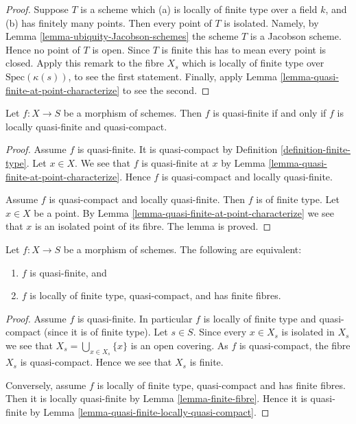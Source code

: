 \begin{proof}
Suppose $T$ is a scheme which (a) is locally of finite type
over a field $k$, and (b) has finitely many points. Then every
point of $T$ is isolated. Namely, by
Lemma \ref{lemma-ubiquity-Jacobson-schemes} the scheme $T$ is a
Jacobson scheme. Hence no point of $T$ is open. Since $T$ is
finite this has to mean every point is closed. Apply this remark
to the fibre $X_s$ which is locally of finite type over
$\text{Spec}(\kappa(s))$, to see the first statement. Finally, apply
Lemma \ref{lemma-quasi-finite-at-point-characterize} to see the second.
\end{proof}


\begin{lemma}
\label{lemma-quasi-finite-locally-quasi-compact}
Let $f : X \to S$ be a morphism of schemes.
Then $f$ is quasi-finite if and only if $f$ is
locally quasi-finite and quasi-compact.
\end{lemma}

\begin{proof}
Assume $f$ is quasi-finite. It is quasi-compact by Definition
\ref{definition-finite-type}. Let $x \in X$.
We see that $f$ is quasi-finite at $x$ by
Lemma \ref{lemma-quasi-finite-at-point-characterize}.
Hence $f$ is quasi-compact and locally quasi-finite.

\medskip\noindent
Assume $f$ is quasi-compact and locally quasi-finite.
Then $f$ is of finite type. Let $x \in X$ be a point.
By Lemma \ref{lemma-quasi-finite-at-point-characterize}
we see that $x$ is an isolated point of its fibre.
The lemma is proved.
\end{proof}

\begin{lemma}
\label{lemma-quasi-finite}
Let $f : X \to S$ be a morphism of schemes.
The following are equivalent:
\begin{enumerate}
\item $f$ is quasi-finite, and
\item $f$ is locally of finite type, quasi-compact, and has finite fibres.
\end{enumerate}
\end{lemma}

\begin{proof}
Assume $f$ is quasi-finite. In particular $f$ is locally of finite type
and quasi-compact (since it is of finite type). Let $s \in S$. Since
every $x \in X_s$ is isolated in $X_s$ we see that
$X_s = \bigcup_{x \in X_s} \{x\}$ is an open covering. As $f$
is quasi-compact, the fibre $X_s$ is quasi-compact. Hence we see
that $X_s$ is finite.

\medskip\noindent
Conversely, assume $f$ is locally of finite type, quasi-compact
and has finite fibres. Then it is locally quasi-finite by
Lemma \ref{lemma-finite-fibre}. Hence it is quasi-finite by
Lemma \ref{lemma-quasi-finite-locally-quasi-compact}.
\end{proof}

